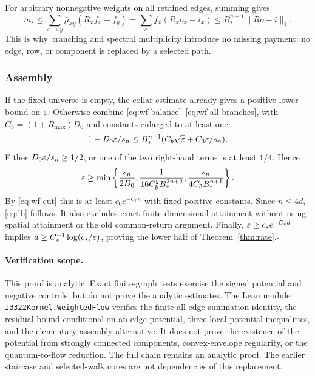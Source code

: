 For arbitrary nonnegative weights on all retained edges, summing gives
\begin{equation}\label{eq:wf-all-branches}
 m_s\le\sum_{x\to y}\bar\mu_{xy}(R_xf_x-f_y)
       =\sum_x f_x(R_xo_x-i_x)
       \le B_*^{n+1}\|Ro-i\|_1.
\end{equation}
This is why branching and spectral multiplicity introduce no missing
payment: no edge, row, or component is replaced by a selected path.

\subsubsection*{Assembly}

If the fixed universe is empty, the collar estimate already gives a
positive lower bound on $\varepsilon$. Otherwise combine
\eqref{eq:wf-balance}--\eqref{eq:wf-all-branches}, with
$C_3=(1+R_{\max})D_0$ and constants enlarged to at least one:
\[
 1-D_0\varepsilon/s_n\le B_*^{n+1}
                 (C_b\sqrt{\varepsilon}+C_3\varepsilon/s_n).
\]
Either $D_0\varepsilon/s_n\ge1/2$, or one of the two right-hand terms is
at least $1/4$. Hence
\[
 \varepsilon\ge\min\left\{\frac{s_n}{2D_0},
 \frac{1}{16C_b^2B_*^{2n+2}},
 \frac{s_n}{4C_3B_*^{n+1}}\right\}.
\]
By \eqref{eq:wf-cut} this is at least $c_0e^{-C_0n}$ with fixed positive
constants. Since $n\le4d$, \eqref{eq:lb} follows. It also excludes exact
finite-dimensional attainment without using spatial attainment or the
old common-return argument. Finally,
$\varepsilon\ge c_*e^{-C_*d}$ implies
$d\ge C_*^{-1}\log(c_*/\varepsilon)$, proving the lower half of
Theorem~\ref{thm:rate}.\hfill$\square$

\paragraph{Verification scope.}
This proof is analytic. Exact finite-graph tests exercise the signed
potential and negative controls, but do not prove the analytic estimates.
The Lean module \texttt{I3322Kernel.WeightedFlow} verifies the finite
all-edge summation identity, the residual bound conditional on an edge
potential, three local potential inequalities, and the elementary
assembly alternative. It does not prove the existence of the potential
from strongly connected components, convex-envelope regularity, or the
quantum-to-flow reduction. The full chain remains an analytic proof.
The earlier staircase and selected-walk cores are not dependencies of
this replacement.
